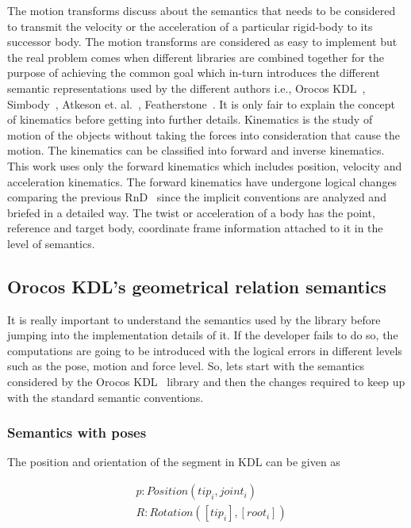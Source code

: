 The motion transforms discuss about the semantics that needs to be considered to transmit the velocity or the acceleration of a particular rigid-body to its successor body. The motion transforms are considered as easy to implement but the real problem comes when different libraries are combined together for the purpose of achieving the common goal which in-turn introduces the different semantic representations used by the different authors i.e., Orocos KDL~\cite{smits2011kdl}, Simbody~\cite{sherman2011simbody}, Atkeson et. al.~\cite{Atkeson}, Featherstone~\cite{featherstone2014rigid}. It is only fair to explain the concept of kinematics before getting into further details. Kinematics is the study of motion of the objects without taking the forces into consideration that cause the motion. The kinematics can be classified into forward and inverse kinematics. This work uses only the forward kinematics which includes position, velocity and acceleration kinematics. The forward kinematics have undergone logical changes comparing the previous RnD~\cite{RnD2Rajagopal} since the implicit conventions are analyzed and briefed in a detailed way. The twist or acceleration of a body has the point, reference and target body, coordinate frame information attached to it in the level of semantics. 

\subsection{Orocos KDL's geometrical relation semantics}

It is really important to understand the semantics used by the library before jumping into the implementation details of it. If the developer fails to do so, the computations are going to be introduced with the logical errors in different levels such as the pose, motion and force level. So, lets start with the semantics considered by the Orocos KDL~\cite{smits2011kdl} library and then the changes required to keep up with the standard semantic conventions. 

\subsubsection*{Semantics with poses}

The position and orientation of the segment in KDL can be given as

\begin{equation}
\begin{aligned}
& p : Position (tip_i, joint_i) \\
& R : Rotation ([tip_i], [root_i])
\end{aligned}
\end{equation}

